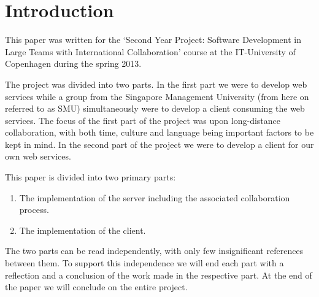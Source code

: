 \section{Introduction}
This paper was written for the `Second Year Project: Software Development in Large Teams with International Collaboration' course at the IT-University of Copenhagen during the spring 2013.

The project was divided into two parts. In the first part we were to develop web services while a group from the Singapore Management University (from here on referred to as SMU) simultaneously were to develop a client consuming the web services.
The focus of the first part of the project was upon long-distance collaboration, with both time, culture and language being important factors to be kept in mind.
In the second part of the project we were to develop a client for our own web services.

This paper is divided into two primary parts:
\begin{enumerate}
\item The implementation of the server including the associated collaboration process.
\item The implementation of the client.
\end{enumerate}

The two parts can be read independently, with only few insignificant references between them. To support this independence we will end each part with a reflection and a conclusion of the work made in the respective part.
At the end of the paper we will conclude on the entire project.
\newpage